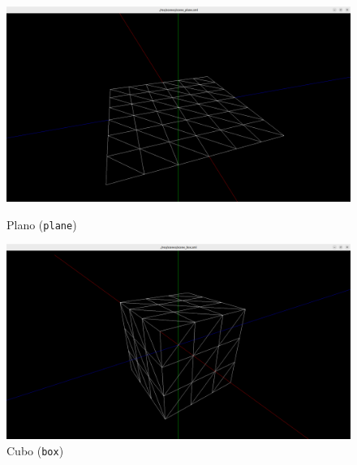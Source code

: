 \documentclass[12pt, a4paper]{article}
\begin{document}
\begin{figure}[H]
    \centering
    \begin{minipage}{0.48\textwidth}
        \centering
        \includegraphics[width=\textwidth]{res/phase1/results/Plane.png}
        \caption{Plano (\texttt{plane})}
    \end{minipage}\hfill
    \begin{minipage}{0.48\textwidth}
        \centering
        \includegraphics[width=\textwidth]{res/phase1/results/Box.png}
        \caption{Cubo (\texttt{box})}
    \end{minipage}
\end{figure}
\end{document}
